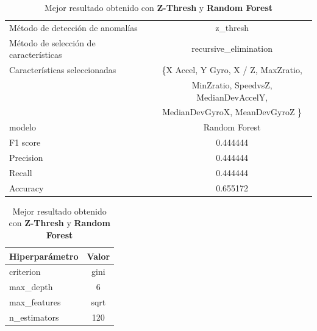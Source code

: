 \begin{appendices}
\begin{table}[htb]
		\end{table}
		\begin{table}[htb]
			\centering
			\caption{Mejor resultado obtenido con \textbf{Z-Thresh} y \textbf{Random Forest}}
			\label{table:33}
			\begin{tabular}{lc}
				\toprule
					  Método de detección de anomalías &                                           z\_thresh \\
				Método de selección de características &                              recursive\_elimination \\
						 Características seleccionadas & \{X Accel, Y Gyro, X / Z, MaxZratio, \\ 
						                               & MinZratio,  SpeedvsZ, MedianDevAccelY,  \\
													   &  MedianDevGyroX, MeanDevGyroZ \}\\
												modelo &                                      Random Forest \\
											  F1 score &                                           0.444444 \\
											 Precision &                                           0.444444 \\
												Recall &                                           0.444444 \\
											  Accuracy &                                           0.655172 \\
				\bottomrule
			\end{tabular}
			\newline
			\newline

			\begin{tabular}{lc}
				\toprule
				Hiperparámetro & Valor \\
				\midrule
					 criterion &  gini \\
					 max\_depth &     6 \\
				  max\_features &  sqrt \\
				  n\_estimators &   120 \\
				\bottomrule
			\end{tabular}
			
		\end{table}
		

\end{appendices}
